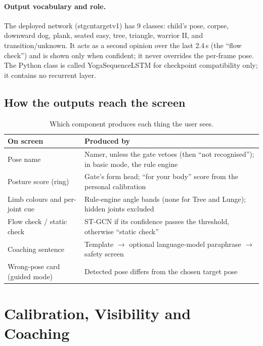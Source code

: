 \documentclass[11pt,a4paper]{article}
\newcommand{\ubrk}{\textunderscore\allowbreak}
\DeclareRobustCommand{\code}[1]{{\ttfamily\small\let\_\ubrk #1}}
\begin{document}
\paragraph{Output vocabulary and role.} The deployed network (\code{stgcn\_target\_v1}) has 9 classes: child's pose, corpse, downward dog, plank, seated easy, tree, triangle, warrior II, and \code{transition/unknown}. It acts as a second opinion over the last 2.4\,s (the ``flow check'') and is shown only when confident; it never overrides the per-frame pose. The Python class is called \code{YogaSequenceLSTM} for checkpoint compatibility only; it contains no recurrent layer.

\subsection{How the outputs reach the screen}
\begin{table}[H]
\centering\small
\caption{Which component produces each thing the user sees.}\label{tab:fusion}
\begin{tabularx}{\textwidth}{@{}L{4.2cm}Y@{}}
\toprule
On screen & Produced by \\ \midrule
Pose name & Namer, unless the gate vetoes (then ``not recognised''); in basic mode, the rule engine \\
Posture score (ring) & Gate's form head; ``for your body'' score from the personal calibration \\
Limb colours and per-joint cue & Rule-engine angle bands (none for Tree and Lunge); hidden joints excluded \\
Flow check / static check & ST-GCN if its confidence passes the threshold, otherwise ``static check'' \\
Coaching sentence & Template $\to$ optional language-model paraphrase $\to$ safety screen \\
Wrong-pose card (guided mode) & Detected pose differs from the chosen target pose \\ \bottomrule
\end{tabularx}
\end{table}

\FloatBarrier
\section{Calibration, Visibility and Coaching}
\end{document}
